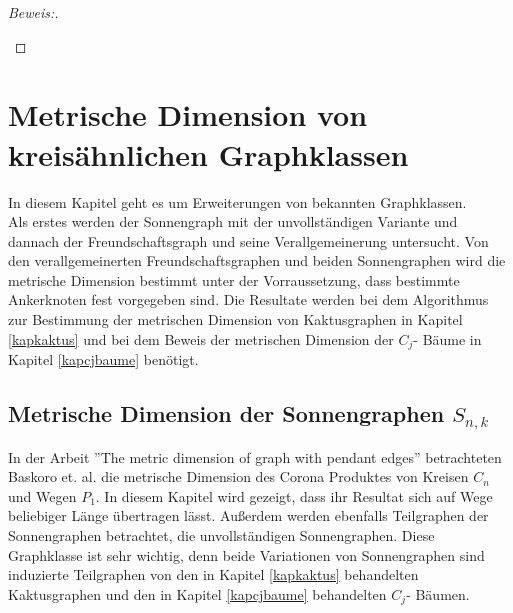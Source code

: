 \begin{proof}[Beweis:]
\begin{enumerate}
\begin{itemize}
\end{itemize}
\end{enumerate}
\end{proof}
\chapter{Metrische Dimension von kreisähnlichen Graphklassen}
\vspace{-5mm}
In diesem Kapitel geht es um Erweiterungen von bekannten Graphklassen.\\Als erstes werden der Sonnengraph mit der unvollständigen Variante und dannach der Freundschaftsgraph und seine Verallgemeinerung untersucht.
Von den verallgemeinerten Freundschaftsgraphen und beiden Sonnengraphen wird die metrische Dimension bestimmt unter der Vorraussetzung, dass bestimmte Ankerknoten fest vorgegeben sind. Die Resultate werden bei dem Algorithmus zur Bestimmung der metrischen Dimension von Kaktusgraphen in Kapitel \ref{kapkaktus} und bei dem Beweis der metrischen Dimension der $C_j$- Bäume in Kapitel \ref{kapcjbaume} benötigt.
\vspace{-4mm}
\section{Metrische Dimension der Sonnengraphen $S_{n,k}$}
\label{chap_sonne}
In der Arbeit ''The metric dimension of graph with pendant edges'' \cite{sun} betrachteten Baskoro et. al. die metrische Dimension des Corona Produktes von Kreisen $C_n$ und Wegen $P_1$. In diesem Kapitel wird gezeigt, dass ihr Resultat sich auf Wege beliebiger Länge übertragen lässt. Außerdem werden ebenfalls Teilgraphen der Sonnengraphen betrachtet, die unvollständigen Sonnengraphen. Diese Graphklasse ist sehr wichtig, denn beide Variationen von Sonnengraphen sind induzierte Teilgraphen von den in Kapitel \ref{kapkaktus} behandelten Kaktusgraphen und den in Kapitel \ref{kapcjbaume} behandelten $C_j$- Bäumen.


